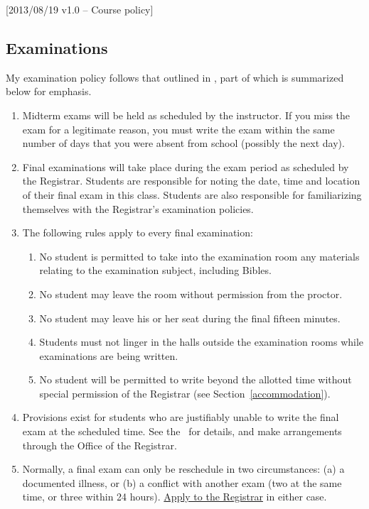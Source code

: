 [2013/08/19 v1.0 -- Course policy]

\subsection{Examinations}
\label{exams}

My examination policy follows that outlined in \SecAC, part of which is
summarized below for emphasis.

\begin{enumerate}
  \item
    Midterm exams will be held as scheduled by the instructor. If you miss
    the exam for a legitimate reason, you must write the exam within the same
    number of days that you were absent from school (possibly the next day).
  \item
    Final examinations will take place during the exam period as scheduled
    by the Registrar. Students are responsible for noting the date, time and
    location of their final exam in this class. Students are also responsible
    for familiarizing themselves with the Registrar's examination policies.
  \item
    The following rules apply to every final examination:
    \begin{enumerate}
      \item
        No student is permitted to take into the examination room any materials
        relating to the examination subject, including Bibles.
      \item
        No student may leave the room without permission from the proctor.
      \item
        No student may leave his or her seat during the final fifteen minutes.
      \item
        Students must not linger in the halls outside the examination rooms
        while examinations are being written.
      \item
        No student will be permitted to write beyond the allotted time without
        special permission of the Registrar (see Section~\ref{accommodation}).
    \end{enumerate}
  \item
    Provisions exist for students who are justifiably unable to write the final
    exam at the scheduled time. See the \AC\ for details, and make arrangements
    through the Office of the Registrar.
  \item
    Normally, a final exam can only be reschedule in two circumstances:
    (a) a documented illness, or (b) a conflict with another
    exam (two at the same time, or three within 24 hours).
    \href{http://www.tyndale.ca/registrar/final-exam-schedule-and-policies}
    {Apply to the Registrar} in either case.
\end{enumerate}
